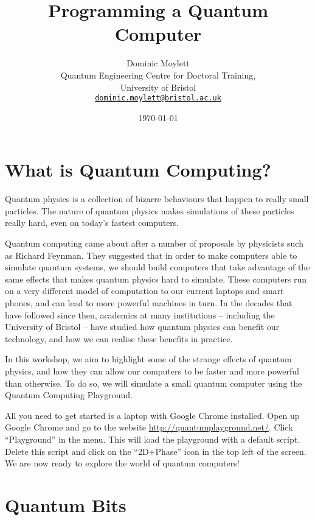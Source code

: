 \documentclass[twocolumn]{article}
\begin{document}
\lstset{style=Style1}

\title{Programming a Quantum Computer}
\author{Dominic Moylett\\
        	Quantum Engineering Centre for Doctoral Training,\\
		University of Bristol\\
		\texttt{\href{mailto:dominic.moylett@bristol.ac.uk}{dominic.moylett@bristol.ac.uk}}
		}
\date{\today}
\maketitle

\section{What is Quantum Computing?}

Quantum physics is a collection of bizarre behaviours that happen to really small particles. The nature of quantum physics makes simulations of these particles really hard, even on today's fastest computers.

Quantum computing came about after a number of proposals by physicists such as Richard Feynman. They suggested that in order to make computers able to simulate quantum systems, we should build computers that take advantage of the same effects that makes quantum physics hard to simulate. These computers run on a very different model of computation to our current laptops and smart phones, and can lead to more powerful machines in turn. In the decades that have followed since then, academics at many institutions -- including the University of Bristol -- have studied how quantum physics can benefit our technology, and how we can realise these benefits in practice.

In this workshop, we aim to highlight some of the strange effects of quantum physics, and how they can allow our computers to be faster and more powerful than otherwise. To do so, we will simulate a small quantum computer using the Quantum Computing Playground.

All you need to get started is a laptop with Google Chrome installed. Open up Google Chrome and go to the website \url{http://quantumplayground.net/}. Click ``Playground'' in the menu. This will load the playground with a default script. Delete this script and click on the ``2D+Phase'' icon in the top left of the screen. We are now ready to explore the world of quantum computers!

\section{Quantum Bits}
\end{document}

